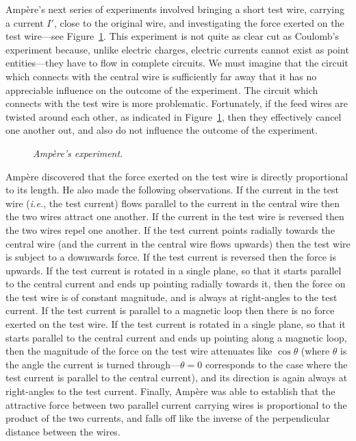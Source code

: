 Amp\`{e}re's next series of experiments involved bringing a short test wire, carrying
a current $I'$,
close to the original wire, and investigating the force exerted on the test wire---see Figure~\ref{f28}.
This experiment is not quite as clear cut as Coulomb's experiment because, unlike
electric charges, 
electric currents cannot exist as point entities---they
have to flow in complete circuits. We must
imagine that the circuit which connects with  the central wire is sufficiently
far away that it has no appreciable influence on the outcome of the experiment.
The circuit which connects with
 the test wire is more problematic. Fortunately, if the
feed wires are twisted around each other, as indicated in Figure~\ref{f28}, then 
they effectively cancel one another out, and also do not influence the outcome of
the experiment.
\begin{figure}
\epsfysize=2.25in
\centerline{}
\caption{\em Amp\`{e}re's experiment.}\label{f28}
\end{figure}

Amp\`{e}re discovered that the force exerted on the test wire is directly proportional
to its length. He also made the following observations.
If the current in the test wire 
({\em i.e.}, the test current) flows parallel to the current in the central wire 
then the two wires  attract one another. If the current in the test
wire is reversed then the two wires  repel one another.
If the test current points radially towards the central wire 
(and the current in the central wire flows upwards) then the test wire
is subject to a downwards force. If the test current is reversed then the force is
upwards. If the test current is rotated in a single plane, so that it starts
parallel to the central current and ends up pointing radially
towards it, then the force on
the test wire is of constant magnitude, and is always at right-angles to the
test current. If the test current is parallel to a magnetic loop then there is
no force exerted on the test wire. If the test current is rotated in
a single plane, so that it starts parallel to the central current and ends up
pointing along a magnetic loop, then the magnitude of the force on the
test wire attenuates like $\cos\theta$ (where $\theta$ is the angle the current
is turned through---$\theta=0$ corresponds to the
case where the test current is parallel to the central current),
 and its direction is again always at right-angles to
the test current. Finally, Amp\`{e}re was able to establish that the attractive
force between two parallel current carrying wires is proportional to the product of
the two currents, and
 falls off like the inverse of the perpendicular
distance between the wires.

